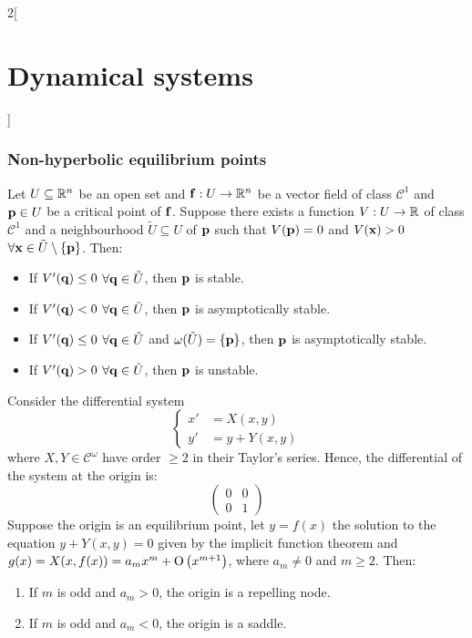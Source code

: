 \documentclass[../../../main_math.tex]{subfiles}
\begin{document}
\begin{multicols}{2}[\section{Dynamical systems}]
  \subsubsection{Non-hyperbolic equilibrium points}
  \begin{theorem}
    Let $U\subseteq \mathbb{R}^n$ be an open set and $\boldsymbol{\mathrm{f}}:U\rightarrow\mathbb{R}^n$ be a vector field of class $\mathcal{C}^1$ and $\boldsymbol{\mathrm{p}}\in U$ be a critical point of $\boldsymbol{\mathrm{f}}$. Suppose there exists a function $V:U\rightarrow\mathbb{R}$ of class $\mathcal{C}^1$ and a neighbourhood $\tilde{U}\subseteq U$ of $\boldsymbol{\mathrm{p}}$ such that $V(\boldsymbol{\mathrm{p}})=0$ and $V(\boldsymbol{\mathrm{x}})>0$ $\forall \boldsymbol{\mathrm{x}}\in\tilde{U}\setminus\{\boldsymbol{\mathrm{p}}\}$. Then:
    \begin{itemize}
      \item If $V'(\boldsymbol{\mathrm{q}})\leq 0$ $\forall \boldsymbol{\mathrm{q}}\in \tilde{U}$, then $\boldsymbol{\mathrm{p}}$ is stable.
      \item If $V'(\boldsymbol{\mathrm{q}})< 0$ $\forall \boldsymbol{\mathrm{q}}\in \tilde{U}$, then $\boldsymbol{\mathrm{p}}$ is asymptotically stable.
      \item If $V'(\boldsymbol{\mathrm{q}})\leq 0$ $\forall \boldsymbol{\mathrm{q}}\in \tilde{U}$ and $\omega(\tilde{U})=\{\boldsymbol{\mathrm{p}}\}$, then $\boldsymbol{\mathrm{p}}$ is asymptotically stable.
      \item If $V'(\boldsymbol{\mathrm{q}})> 0$ $\forall \boldsymbol{\mathrm{q}}\in \tilde{U}$, then $\boldsymbol{\mathrm{p}}$ is unstable.
    \end{itemize}
  \end{theorem}
  \begin{theorem}\label{DS_thmA}
    Consider the differential system
    $$
      \left\{
      \begin{aligned}
        {x}' & = X(x,y)    \\
        {y}' & = y+ Y(x,y)
      \end{aligned}
      \right.
    $$
    where $X,Y\in\mathcal{C}^\omega$ have order $\geq 2$ in their Taylor's series. Hence, the differential of the system at the origin is:
    $$\begin{pmatrix}
        0 & 0 \\
        0 & 1
      \end{pmatrix}$$ Suppose the origin is an equilibrium point, let $y=f(x)$ the solution to the equation $y+Y(x,y)=0$ given by the implicit function theorem and $g(x)=X(x,f(x))=a_mx^m+\mathrm{O}\left(x^{m+1}\right)$, where $a_m\ne 0$ and $m\geq 2$. Then:
    \begin{enumerate}
      \item If $m$ is odd and $a_m>0$, the origin is a repelling node.
      \item If $m$ is odd and $a_m<0$, the origin is a saddle.

\end{enumerate}
\end{theorem}
\end{multicols}
\end{document}

